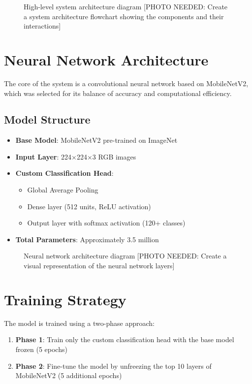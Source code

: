 \documentclass[11pt,a4paper]{report}
\begin{document}
\begin{figure}[H]
    \centering
    \fbox{\rule{0pt}{15cm}\rule{12cm}{0pt}}
    \caption{High-level system architecture diagram [PHOTO NEEDED: Create a system architecture flowchart showing the components and their interactions]}
    \label{fig:architecture}
\end{figure}

\section{Neural Network Architecture}
The core of the system is a convolutional neural network based on MobileNetV2, which was selected for its balance of accuracy and computational efficiency.

\subsection{Model Structure}
\begin{itemize}
    \item \textbf{Base Model}: MobileNetV2 pre-trained on ImageNet
    \item \textbf{Input Layer}: 224×224×3 RGB images
    \item \textbf{Custom Classification Head}:
    \begin{itemize}
        \item Global Average Pooling
        \item Dense layer (512 units, ReLU activation)
        \item Output layer with softmax activation (120+ classes)
    \end{itemize}
    \item \textbf{Total Parameters}: Approximately 3.5 million
\end{itemize}

\begin{figure}[H]
    \centering
    \fbox{\rule{0pt}{10cm}\rule{12cm}{0pt}}
    \caption{Neural network architecture diagram [PHOTO NEEDED: Create a visual representation of the neural network layers]}
    \label{fig:nn_architecture}
\end{figure}

\section{Training Strategy}
The model is trained using a two-phase approach:

\begin{enumerate}
    \item \textbf{Phase 1}: Train only the custom classification head with the base model frozen (5 epochs)
    \item \textbf{Phase 2}: Fine-tune the model by unfreezing the top 10 layers of MobileNetV2 (5 additional epochs)
\end{enumerate}
\end{document}
